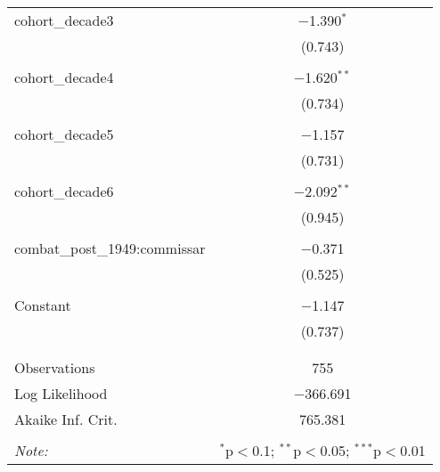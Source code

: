 \documentclass[12pt,letterpaper]{article}
\begin{document}
\begin{table}[!htbp]
\begin{tabular}{@{\extracolsep{5pt}}lc}
		cohort\_decade3 & $-$1.390$^{*}$ \\ 
		& (0.743) \\ 
		& \\ 
		cohort\_decade4 & $-$1.620$^{**}$ \\ 
		& (0.734) \\ 
		& \\ 
		cohort\_decade5 & $-$1.157 \\ 
		& (0.731) \\ 
		& \\ 
		cohort\_decade6 & $-$2.092$^{**}$ \\ 
		& (0.945) \\ 
		& \\ 
		combat\_post\_1949:commissar & $-$0.371 \\ 
		& (0.525) \\ 
		& \\ 
		Constant & $-$1.147 \\ 
		& (0.737) \\ 
		& \\ 
		\hline \\[-1.8ex] 
		Observations & 755 \\ 
		Log Likelihood & $-$366.691 \\ 
		Akaike Inf. Crit. & 765.381 \\ 
		\hline 
		\hline \\[-1.8ex] 
		\textit{Note:}  & \multicolumn{1}{r}{$^{*}$p$<$0.1; $^{**}$p$<$0.05; $^{***}$p$<$0.01} \\ 
	\end{tabular} 
\end{table} 
\end{document}
